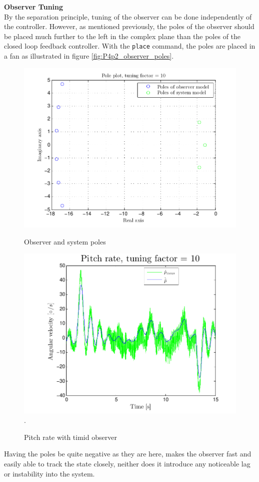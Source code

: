 \textbf{Observer Tuning}\\
By the separation principle, tuning of the observer can be done independently of the controller. However, as mentioned previously, the poles of the observer should be placed much further to the left in the complex plane than the poles of the closed loop feedback controller. With the \texttt{place} command, the poles are placed in a fan as illustrated in figure \ref{fig:P4p2_observer_poles}.
\begin{figure}[htb]
    \begin{minipage}{0.5\textwidth}
    	\centering
    	\includegraphics[width=1\textwidth,trim={0cm 0cm 0cm 0cm},clip]{figures/P4p2_pole_plot_tuning_factor_10.pdf}
    	\caption{Observer and system poles}
        \label{fig:P4p2_observer_poles}
    \end{minipage}
    \begin{minipage}{0.5\textwidth}
        \centering
    	\includegraphics[width=1\textwidth,trim={0cm 0cm 0cm 0cm},clip]{figures/P4p2_pitch_rate_tuning_factor_10.pdf}.
    	\caption{Pitch rate with timid observer}
        \label{fig:P4p2_pitch_rate_10}
    \end{minipage}
\end{figure}
Having the poles be quite negative as they are here, makes the observer fast and easily able to track the state closely, neither does it introduce any noticeable lag or instability into the system.

